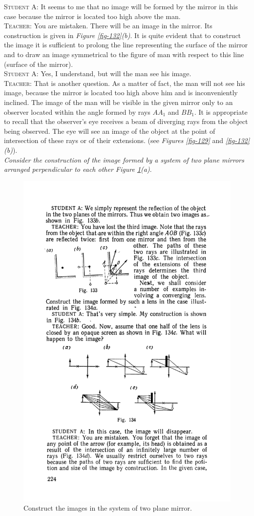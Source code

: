 \documentclass[a4paper,sfsidenotes]{tufte-book}
\begin{document}
\textsc{Student A:} It seems to me that no image will be formed by the mirror in this case because the mirror is located too high above the man.
\\
\textsc{Teacher:} You are mistaken. There will be an image in the mirror. Its construction is given in \emph{Figure \ref{fig-132}(b)}. It is quite evident that to construct the image it is sufficient to prolong the line representing the surface of the mirror  and to draw an image symmetrical to the figure of man with respect to this line (surface of the mirror). 
\\
\textsc{Student A:} Yes, I understand, but will the man see his image.
\\
\textsc{Teacher:} That is another question. As a matter of fact, the man will not see his image, because the mirror is located too high above him and is inconveniently inclined. The image of the man will be visible in the given mirror only to an observer located within the angle formed by rays $AA_{1}$ and $BB_{1}$. It is appropriate to recall that the observer's eye receives a beam of diverging rays from the object being observed. The eye will see an image of the object at the point of intersection of these rays or of their extensions. (see \emph{Figures \ref{fig-129}} and \emph{\ref{fig-132}(b)}).
\\
\emph{Consider the construction of the image formed by a system of two plane mirrors arranged perpendicular to each other \emph{Figure \ref{fig-133}(a)}}.
\\
\begin{figure}%
\includegraphics[width=.7\linewidth,angle=-3]{fig-133a}
\caption{Construct the images in the system of two plane mirror.}
\label{fig-133}
\end{figure}
\end{document}
